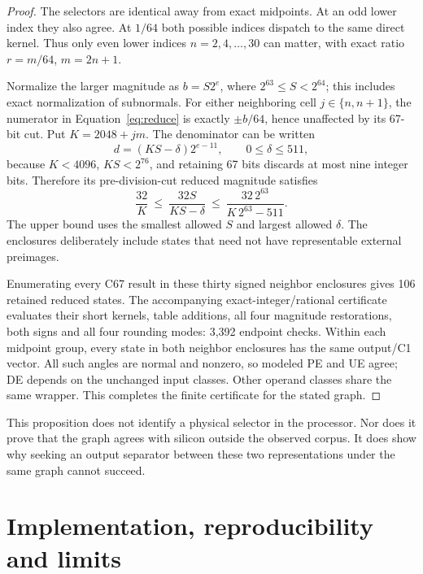 \documentclass[11pt]{article}
\begin{document}
\begin{proof}
The selectors are identical away from exact midpoints. At an odd lower
index they also agree. At $1/64$ both possible indices dispatch to the same
direct kernel. Thus only even lower indices $n=2,4,\ldots,30$ can matter,
with exact ratio $r=m/64$, $m=2n+1$.

Normalize the larger magnitude as $b=S2^e$, where
$2^{63}\le S<2^{64}$; this includes exact normalization of subnormals.
For either neighboring cell $j\in\{n,n+1\}$, the numerator in
Equation~\eqref{eq:reduce} is exactly $\pm b/64$, hence unaffected by its
67-bit cut. Put $K=2048+jm$. The denominator can be written
\begin{equation}
 d=(KS-\delta)2^{e-11},\qquad 0\le\delta\le511,
\end{equation}
because $K<4096$, $KS<2^{76}$, and retaining 67 bits discards at most nine
integer bits. Therefore its pre-division-cut reduced magnitude satisfies
\begin{equation}
 \frac{32}{K}\ \le\ \frac{32S}{KS-\delta}\ \le\
 \frac{32\,2^{63}}{K\,2^{63}-511}.
 \label{eq:enclosure}
\end{equation}
The upper bound uses the smallest allowed $S$ and largest allowed
$\delta$. The enclosures deliberately include states that need not have
representable external preimages.

Enumerating every C67 result in these thirty signed neighbor enclosures
gives 106 retained reduced states. The accompanying exact-integer/rational
certificate evaluates their short kernels, table additions, all four
magnitude restorations, both signs and all four rounding modes: 3,392
endpoint checks. Within each midpoint group, every state in both neighbor
enclosures has the same output/C1 vector. All such angles are normal and
nonzero, so modeled PE and UE agree; DE depends on the unchanged input
classes. Other operand classes share the same wrapper. This completes the
finite certificate for the stated graph.
\end{proof}

This proposition does not identify a physical selector in the processor.
Nor does it prove that the graph agrees with silicon outside the observed
corpus. It does show why seeking an output separator between these two
representations under the same graph cannot succeed.

\section{Implementation, reproducibility and limits}
\end{document}
